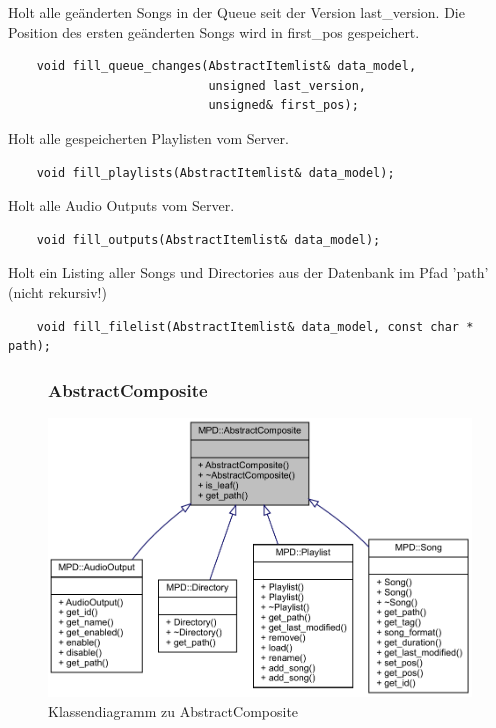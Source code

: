 Holt alle geänderten Songs in der Queue seit der Version last\_version. Die Position des ersten geänderten Songs wird in first\_pos gespeichert. 
\begin{verbatim}
    void fill_queue_changes(AbstractItemlist& data_model,
                            unsigned last_version,
                            unsigned& first_pos);
\end{verbatim}

Holt alle gespeicherten Playlisten vom Server.
\begin{verbatim}              
    void fill_playlists(AbstractItemlist& data_model);
\end{verbatim}

Holt alle Audio Outputs vom Server.
\begin{verbatim}
    void fill_outputs(AbstractItemlist& data_model);
\end{verbatim}

Holt ein Listing aller Songs und Directories aus der Datenbank im Pfad 'path' (nicht rekursiv!)              
\begin{verbatim}
    void fill_filelist(AbstractItemlist& data_model, const char * path);
\end{verbatim}


\newpage
\begin{figure}[htb!]
\subsubsection{AbstractComposite}
	\centering
        \includegraphics[width=\textwidth]{./gfx/class/abstractcomposite}
	\caption{Klassendiagramm zu AbstractComposite}
	\label{c_abstract_composite}
\end{figure}

